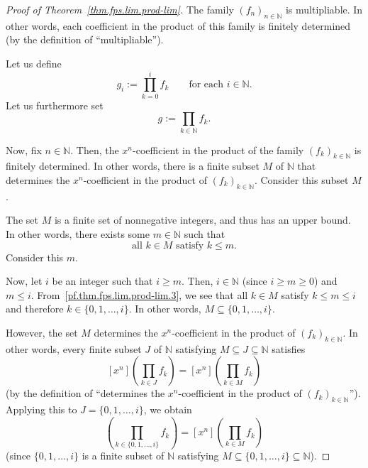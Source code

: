\begin{proof}[Proof of Theorem~\ref{thm.fps.lim.prod-lim}]
\leanok
The family $(f_n)_{n\in\mathbb{N}}$ is multipliable. In other words,
each coefficient in the product of this family is finitely determined
(by the definition of ``multipliable'').

Let us define
\begin{equation}
g_i := \prod_{k=0}^{i} f_k
\qquad\text{for each } i\in\mathbb{N}.
\label{pf.thm.fps.lim.prod-lim.gi}
\end{equation}
Let us furthermore set
\begin{equation}
g := \prod_{k\in\mathbb{N}} f_k.
\label{pf.thm.fps.lim.prod-lim.g}
\end{equation}

Now, fix $n\in\mathbb{N}$. Then, the $x^n$-coefficient in the product
of the family $(f_k)_{k\in\mathbb{N}}$ is finitely determined. In other
words, there is a finite subset $M$ of $\mathbb{N}$ that determines the
$x^n$-coefficient in the product of $(f_k)_{k\in\mathbb{N}}$. Consider
this subset $M$.

The set $M$ is a finite set of nonnegative integers, and thus has an
upper bound. In other words, there exists some $m\in\mathbb{N}$ such
that
\begin{equation}
\text{all } k\in M \text{ satisfy } k\leq m.
\label{pf.thm.fps.lim.prod-lim.3}
\end{equation}
Consider this $m$.

Now, let $i$ be an integer such that $i\geq m$. Then,
$i\in\mathbb{N}$ (since $i\geq m\geq 0$) and $m\leq i$.
From~\eqref{pf.thm.fps.lim.prod-lim.3}, we see that all $k\in M$
satisfy $k\leq m\leq i$ and therefore $k\in\{0,1,\ldots,i\}$. In other
words, $M\subseteq\{0,1,\ldots,i\}$.

However, the set $M$ determines the $x^n$-coefficient in the product of
$(f_k)_{k\in\mathbb{N}}$. In other words, every finite subset $J$ of
$\mathbb{N}$ satisfying $M\subseteq J\subseteq\mathbb{N}$ satisfies
\[
[x^n]\left(\prod_{k\in J} f_k\right) = [x^n]\left(\prod_{k\in M} f_k\right)
\]
(by the definition of ``determines the $x^n$-coefficient in the product
of $(f_k)_{k\in\mathbb{N}}$''). Applying this to
$J = \{0,1,\ldots,i\}$, we obtain
\begin{equation}
[x^n]\left(\prod_{k\in\{0,1,\ldots,i\}} f_k\right)
= [x^n]\left(\prod_{k\in M} f_k\right)
\label{pf.thm.fps.lim.prod-lim.4}
\end{equation}
(since $\{0,1,\ldots,i\}$ is a finite subset of $\mathbb{N}$ satisfying
$M\subseteq\{0,1,\ldots,i\}\subseteq\mathbb{N}$).


\end{proof}
